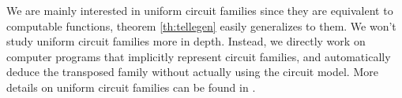 We are mainly interested in uniform circuit families since they are
equivalent to computable functions, theorem \ref{th:tellegen} easily
generalizes to them. We won't study uniform circuit families more in
depth. Instead, we directly work on computer programs that implicitly
represent circuit families, and automatically deduce the transposed
family without actually using the circuit model. More details on
uniform circuit families can be found in \cite{Vollmer}.



%
